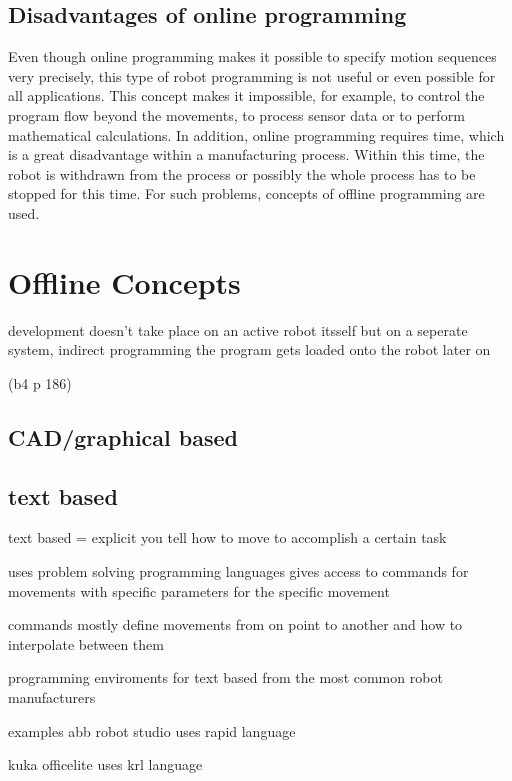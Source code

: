 \documentclass[conference]{IEEEtran}
\begin{document}
    \subsection{Disadvantages of online programming}
    Even though online programming makes it possible to specify motion sequences very precisely, this type of robot programming is not useful or even possible for all applications. This concept makes it impossible, for example, to control the program flow beyond the movements, to process sensor data or to perform mathematical calculations. In addition, online programming requires time, which is a great disadvantage within a manufacturing process. Within this time, the robot is withdrawn from the process or possibly the whole process has to be stopped for this time. For such problems, concepts of offline programming are used. %

\section{Offline Concepts}

    development doesn't take place on an active robot itsself but on a seperate system, indirect programming
    the program gets loaded onto the robot later on

     (b4 p 186)

    \subsection{CAD/graphical based}
    \subsection{text based}

        text based = explicit
        you tell how to move to accomplish a certain task

        uses problem solving programming languages 
        gives access to commands for movements with specific parameters for the specific movement

        commands mostly define movements from on point to another and how to interpolate between them %
        
        programming enviroments for text based from the most common robot manufacturers %
        
        examples 
        abb robot studio
        uses rapid language %

        kuka officelite
        uses krl language %
\end{document}
